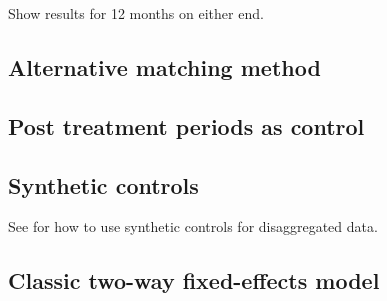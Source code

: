 Show results for 12 months on either end.

\subsection{Alternative matching method}%
\label{sub:alternative_matching_method}

\subsection{Post treatment periods as control}%
\label{sub:post_treatment_periods_as_control}

\subsection{Synthetic controls}%
\label{sub:synthetic_controls}

See \citet{abadie2021penalized} for how to use synthetic controls for disaggregated data.

\subsection{Classic two-way fixed-effects model}%
\label{sub:classic_two_way_fixed_effects_model}
